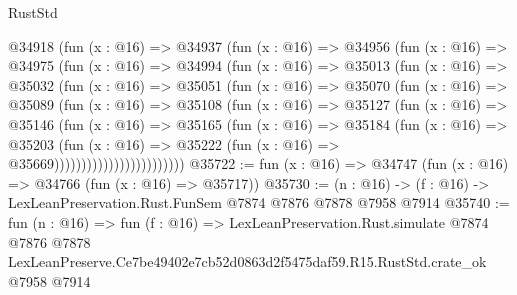 \begin{lexlean}{RustStd}
\begin{coremodule}
                @34918
                  (fun (x : @16) =>
                  @34937
                    (fun (x : @16) =>
                    @34956
                      (fun (x : @16) =>
                      @34975
                        (fun (x : @16) =>
                        @34994
                          (fun (x : @16) =>
                          @35013
                            (fun (x : @16) =>
                            @35032
                              (fun (x : @16) =>
                              @35051
                                (fun (x : @16) =>
                                @35070
                                  (fun (x : @16) =>
                                  @35089
                                    (fun (x : @16) =>
                                    @35108
                                      (fun (x : @16) =>
                                      @35127
                                        (fun (x : @16) =>
                                        @35146
                                          (fun (x : @16) =>
                                          @35165
                                            (fun (x : @16) =>
                                            @35184
                                              (fun (x : @16) =>
                                              @35203
                                                (fun (x : @16) =>
                                                @35222
                                                  (fun (x : @16) => @35669))))))))))))))))))))))))
@35722 := fun (x : @16) => @34747 (fun (x : @16) => @34766 (fun (x : @16) => @35717))
@35730 := (n : @16) -> (f : @16) -> LexLeanPreservation.Rust.FunSem @7874 @7876 @7878 @7958 @7914
@35740 := fun (n : @16) =>
  fun (f : @16) =>
  LexLeanPreservation.Rust.simulate
    @7874
    @7876
    @7878
    LexLeanPreserve.Ce7be49402e7cb52d0863d2f5475daf59.R15.RustStd.crate_ok
    @7958
    @7914
\end{coremodule}
\end{lexlean}

